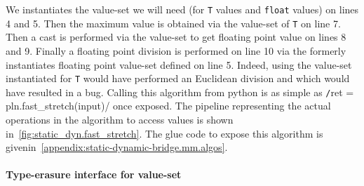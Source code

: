 We instantiates the value-set we will need (for \texttt{T} values and \texttt{float} values) on lines 4 and 5. Then the
maximum value is obtained via the value-set of \texttt{T} on line 7. Then a cast is performed via the value-set to get
floating point value on lines 8 and 9. Finally a floating point division is performed on line 10 via the formerly
instantiates floating point value-set defined on line 5. Indeed, using the value-set instantiated for \texttt{T} would
have performed an Euclidean division and which would have resulted in a bug. Calling this algorithm from python is as
simple as \texttt/ret = pln.fast_stretch(input)/ once exposed. The pipeline representing the actual
operations in the algorithm to access values is shown in~\cref{fig:static_dyn.fast_stretch}. The glue code to expose
this algorithm is givenin~\cref{appendix:static-dynamic-bridge.mm.algos}.

\paragraph{Type-erasure interface for value-set}

